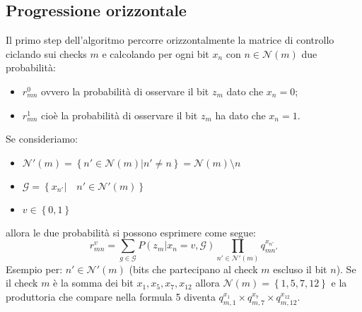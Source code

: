 \documentclass{article}
\begin{document}
	\subsection{Progressione orizzontale}
	Il primo step dell'algoritmo percorre orizzontalmente la matrice di controllo ciclando sui checks $m$ e calcolando per ogni bit $x_n$ con $n \in \mathcal{N}(m)$ due probabilità:
	\begin{itemize}
		\item $r^0_{mn}$ ovvero la probabilità di osservare il bit $z_m$ dato che $x_n =0$;
		\item $r^1_{mn}$ cioè la probabilità di osservare il bit $z_m$ ha dato che $x_n =1$.
	\end{itemize}
	Se consideriamo:
	\begin{itemize}
		\item $\mathcal{N}'(m)=\left\{n' \in \mathcal{N}(m)| n' \neq n\right\} = \mathcal{N}(m) \setminus n$
		\item $\mathcal{G}=\left\{x_{n'} | \quad n' \in \mathcal{N}'(m) \right\}$ 
		\item $v \in \left\{0,1\right\}$
	\end{itemize}
	allora le due probabilità si possono esprimere come segue:
	\begin{equation}
		r^v_{mn}= \sum_{g \in \mathcal{G}} P(z_m|x_n = v, \mathcal{G}) \prod_{n' \in \mathcal{N}'(m)} q^{x_{n'}}_{mn'}
	\end{equation}
	Esempio per: $n' \in \mathcal{N}'(m)$ (bits che partecipano al check $m$ escluso il bit $n$). Se il check $m$ è la somma dei bit $x_1, x_5, x_7, x_{12}$ allora $\mathcal{N}(m) = \left\{ 1,5,7,12\right\}$ e la produttoria che compare nella formula 5 diventa $q_{m,1}^{x_1} \times q_{m, 7}^{x_7} \times q_{m,12}^{x_{12}}$.
	
\end{document}
